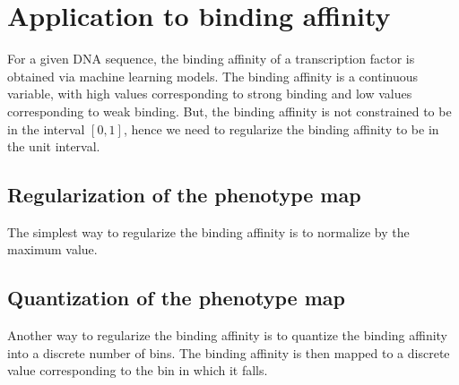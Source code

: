 \documentclass{article}
\begin{document}
    \newpage

    \section{Application to binding affinity}\label{sec:application-to-binding-affinity}

    For a given DNA sequence, the binding affinity of a transcription factor is obtained via machine learning models.
    The binding affinity is a continuous variable, with high values corresponding to strong binding and low values corresponding to weak binding.
    But, the binding affinity is not constrained to be in the interval $[0, 1]$, hence we need to regularize the binding affinity to be in the unit interval.

    \subsection{Regularization of the phenotype map}\label{subsec:regularization-of-the-phenotype-map}
    The simplest way to regularize the binding affinity is to normalize by the maximum value.

    \subsection{Quantization of the phenotype map}\label{subsec:quantization-of-the-phenotype-map}
    Another way to regularize the binding affinity is to quantize the binding affinity into a discrete number of bins.
    The binding affinity is then mapped to a discrete value corresponding to the bin in which it falls.

    \printbibliography
\end{document}
